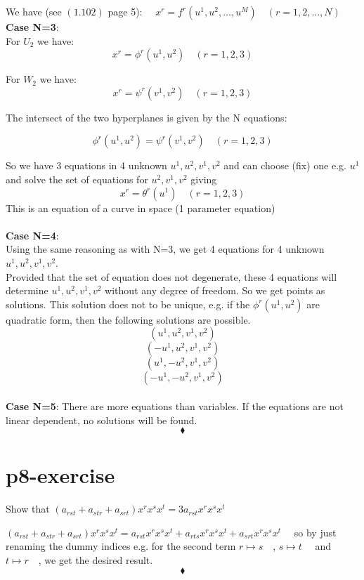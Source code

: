 We have (see $\mathbf{(1.102)}$ page 5):
$\quad x^r = f^r(u^1, u^2,..., u^M) \quad (r = 1, 2, ...,N)$\\

\textbf{Case N=3}: \\

For $U_2$ we have:
$$x^r = \phi^r(u^1, u^2) \quad (r = 1, 2, 3)$$

For $W_2$ we have:
$$x^r = \psi^r(v^1, v^2) \quad (r = 1, 2, 3)$$

The intersect of the two hyperplanes is given by the N equations:

$$\phi^r(u^1, u^2) = \psi^r(v^1, v^2) \quad (r = 1, 2, 3)$$

So we have 3 equations in 4 unknown $u^1,u^2, v^1, v^2$ and can choose (fix) one e.g. $u^1$ and solve the set of equations  for $u^2, v^1, v^2$ giving 
$$x^r = \theta^r(u^1) \quad (r = 1, 2, 3)$$
This is an equation of a curve in space (1 parameter equation)\\\\
\textbf{Case N=4}: \\
Using the same reasoning as with N=3, we get 4 equations for 4 unknown $u^1,u^2, v^1, v^2$.\\
Provided that the set of equation does not degenerate, these 4 equations will determine $u^1,u^2, v^1, v^2$ without any degree of freedom. So we get  points as solutions. This solution does not to be unique, e.g. if the $\phi^r(u^1, u^2)$ are quadratic form, then the following solutions are possible.
$$(u^1,u^2, v^1, v^2)$$
$$(-u^1,u^2, v^1, v^2)$$
$$ (u^1,-u^2, v^1, v^2)$$
$$ (-u^1,-u^2, v^1, v^2)$$
\\
\textbf{Case N=5}: There are more equations than variables. If the equations are not linear dependent, no solutions will be found.
$$\blacklozenge$$
\pagebreak[4]
\section{p8-exercise}

\begin{tcolorbox}
Show that $(a_{rst}+a_{str}+a_{srt})x^rx^sx^t = 3a_{rst}x^rx^sx^t$
\end{tcolorbox}
$(a_{rst}+a_{str}+a_{srt})x^rx^sx^t = a_{rst}x^rx^sx^t+a_{rts}x^rx^sx^t+a_{srt}x^rx^sx^t\quad$
so by just renaming the dummy indices e.g. for the second term  $r \mapsto s\quad$, $s \mapsto t\quad$ and $t \mapsto r\quad$, we get the desired result.
$$\blacklozenge$$
\pagebreak[4]


